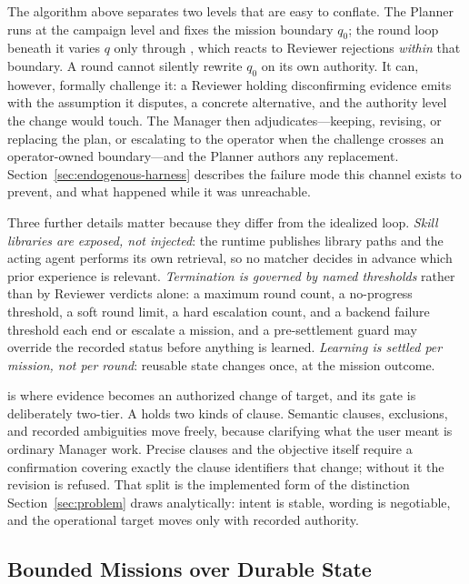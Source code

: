 The algorithm above separates two levels that are easy to conflate. The
Planner runs at the campaign level and fixes the mission boundary $q_0$; the round
loop beneath it varies $q$ only through , which reacts to
Reviewer rejections \emph{within} that boundary. A round cannot silently rewrite
$q_0$ on its own authority. It can, however, formally challenge it: a Reviewer
holding disconfirming evidence emits  with the
assumption it disputes, a concrete alternative, and the authority level the change
would touch. The Manager then adjudicates---keeping, revising, or replacing the plan,
or escalating to the operator when the challenge crosses an operator-owned
boundary---and the Planner authors any replacement. Section~\ref{sec:endogenous-harness}
describes the failure mode this channel exists to prevent, and what happened while it
was unreachable.

Three further details matter because they differ from the idealized loop.
\emph{Skill libraries are exposed, not injected}: the runtime publishes library paths
and the acting agent performs its own retrieval, so no matcher decides in advance
which prior experience is relevant. \emph{Termination is governed by named
thresholds} rather than by Reviewer verdicts alone: a maximum round count, a
no-progress threshold, a soft round limit, a hard escalation count, and a backend
failure threshold each end or escalate a mission, and a pre-settlement guard may
override the recorded status before anything is learned. \emph{Learning is settled
per mission, not per round}: reusable state changes once, at the mission outcome.

 is where evidence becomes an authorized change of target, and
its gate is deliberately two-tier. A  holds two kinds of clause.
Semantic clauses, exclusions, and recorded ambiguities move freely, because
clarifying what the user meant is ordinary Manager work. Precise clauses and the
objective itself require a confirmation covering exactly the clause identifiers that
change; without it the revision is refused. That split is the implemented form of the
distinction Section~\ref{sec:problem} draws analytically: intent is stable, wording
is negotiable, and the operational target moves only with recorded authority.

\subsection{Bounded Missions over Durable State}

